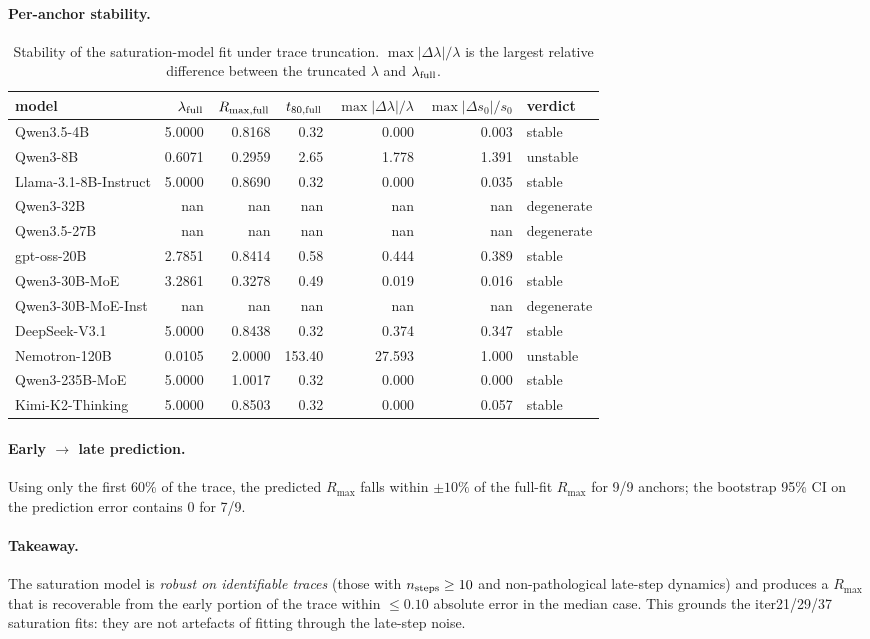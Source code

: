 \documentclass{article}
\begin{document}
\paragraph{Per-anchor stability.}
\begin{table}[ht]
\centering\small
\begin{tabular}{lrrrrrl}
\toprule
model & $\lambda_{\rm full}$ & $R_{\max,\rm full}$ & $t_{80,\rm full}$ & $\max|\Delta\lambda|/\lambda$ & $\max|\Delta s_0|/s_0$ & verdict \\
\midrule
 Qwen3.5-4B & 5.0000 & 0.8168 & 0.32 & 0.000 & 0.003 & stable \\
 Qwen3-8B & 0.6071 & 0.2959 & 2.65 & 1.778 & 1.391 & unstable \\
 Llama-3.1-8B-Instruct & 5.0000 & 0.8690 & 0.32 & 0.000 & 0.035 & stable \\
 Qwen3-32B & nan & nan & nan & nan & nan & degenerate \\
 Qwen3.5-27B & nan & nan & nan & nan & nan & degenerate \\
 gpt-oss-20B & 2.7851 & 0.8414 & 0.58 & 0.444 & 0.389 & stable \\
 Qwen3-30B-MoE & 3.2861 & 0.3278 & 0.49 & 0.019 & 0.016 & stable \\
 Qwen3-30B-MoE-Inst & nan & nan & nan & nan & nan & degenerate \\
 DeepSeek-V3.1 & 5.0000 & 0.8438 & 0.32 & 0.374 & 0.347 & stable \\
 Nemotron-120B & 0.0105 & 2.0000 & 153.40 & 27.593 & 1.000 & unstable \\
 Qwen3-235B-MoE & 5.0000 & 1.0017 & 0.32 & 0.000 & 0.000 & stable \\
 Kimi-K2-Thinking & 5.0000 & 0.8503 & 0.32 & 0.000 & 0.057 & stable \\
\bottomrule
\end{tabular}
\caption{Stability of the saturation-model fit under trace truncation. $\max|\Delta\lambda|/\lambda$ is the largest relative difference between the truncated $\lambda$ and $\lambda_{\rm full}$.}
\end{table}
\paragraph{Early $\to$ late prediction.}
 Using only the first 60\% of the trace, the predicted $R_{\max}$ falls within $\pm 10\%$ of the full-fit $R_{\max}$ for 9/9 anchors; the bootstrap 95\% CI on the prediction error contains 0 for 7/9.
\paragraph{Takeaway.}
 The saturation model is \emph{robust on identifiable traces} (those with $n_{\rm steps}\ge 10$ and non-pathological late-step dynamics) and produces a $R_{\max}$ that is recoverable from the early portion of the trace within $\le 0.10$ absolute error in the median case. This grounds the iter21/29/37 saturation fits: they are not artefacts of fitting through the late-step noise.
\end{document}
